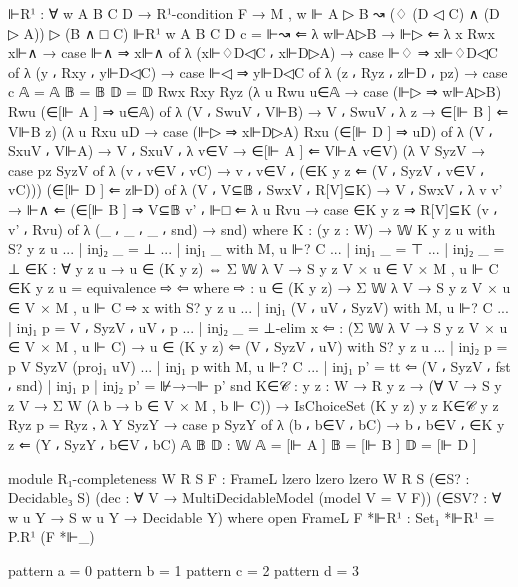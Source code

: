 \begin{spverbatim}
  ⊩R¹ : ∀ {w A B C D} → R¹-condition F
    → M , w ⊩ A ▷ B ↝ (♢ (D ◁ C) ∧ (D ▷ A)) ▷ (B ∧ □ C)
  ⊩R¹ {w} {A} {B} {C} {D} c = ⊩↝ ⇐ λ w⊩A▷B → ⊩▷ ⇐ λ { {x} Rwx x⊩∧ →
    case ⊩∧ ⇒ x⊩∧ of λ { (x⊩♢D◁C ⸴ x⊩D▷A) → case ⊩♢ ⇒ x⊩♢D◁C of
    λ { (y ⸴ Rxy ⸴ y⊩D◁C) → case ⊩◁ ⇒ y⊩D◁C of
    λ { (z ⸴ Ryz ⸴ z⊩D ⸴ pz) → case c {𝔸 = 𝔸} {𝔹 = 𝔹} {𝔻 = 𝔻} Rwx Rxy Ryz
    (λ {u} Rwu u∈𝔸 → case (⊩▷ ⇒ w⊩A▷B) Rwu (∈[⊩ A ] ⇒ u∈𝔸) of λ { (V ⸴ SwuV ⸴ V⊩B)
      → V ⸴ SwuV ⸴ λ {z → ∈[⊩ B ] ⇐ V⊩B z}}) (λ {u} Rxu uD → case (⊩▷ ⇒ x⊩D▷A) Rxu (∈[⊩ D ] ⇒ uD) of
      λ { (V ⸴ SxuV ⸴ V⊩A) → V ⸴ SxuV ⸴ λ {v∈V → ∈[⊩ A ] ⇐ V⊩A v∈V}}) (λ { {V} SyzV → case pz SyzV of
      λ { (v ⸴ v∈V ⸴ vC) → v ⸴ v∈V ⸴ (∈K y z ⇐ (V ⸴ SyzV ⸴ v∈V ⸴ vC))}}) (∈[⊩ D ] ⇐ z⊩D) of
    λ { (V ⸴ V⊆𝔹 ⸴ SwxV ⸴ R[V]⊆K) → V ⸴ SwxV ⸴ λ { {v} v' → ⊩∧ ⇐ (∈[⊩ B ] ⇒ V⊆𝔹 v' ⸴ ⊩□ ⇐
    λ { {u} Rvu → case ∈K y z ⇒ R[V]⊆K (v ⸴ v' ⸴ Rvu) of
    λ { (_ ⸴ _ ⸴ _ ⸴ snd) → snd}})}}}}}}
    where
    K : (y z : W) → 𝕎
    K y z u with S? y z u
    ... | inj₂ _ = ⊥
    ... | inj₁ _ with M, u ⊩? C
    ... | inj₁ _ = ⊤
    ... | inj₂ _ = ⊥
    ∈K : ∀ y z {u} → u ∈ (K y z) ⇔ Σ 𝕎 λ V → S y z V × u ∈ V × M , u ⊩ C
    ∈K y z {u} = equivalence ⇨ ⇦
      where
      ⇨ : u ∈ (K y z) → Σ 𝕎 λ V → S y z V × u ∈ V × M , u ⊩ C
      ⇨ x with S? y z u
      ... | inj₁ (V ⸴ uV ⸴ SyzV) with M, u ⊩? C
      ... | inj₁ p = V ⸴ SyzV ⸴ uV ⸴ p
      ... | inj₂ _ = ⊥-elim x
      ⇦ : (Σ 𝕎 λ V → S y z V × u ∈ V × M , u ⊩ C) → u ∈ (K y z)
      ⇦ (V ⸴ SyzV ⸴ uV) with S? y z u
      ... | inj₂ p = p V SyzV (proj₁ uV)
      ... | inj₁ p with M, u ⊩? C
      ... | inj₁ p' = tt
      ⇦ (V ⸴ SyzV ⸴ fst ⸴ snd) | inj₁ p | inj₂ p' = ⊮→¬⊩ p' snd
    K∈𝒞 : {y z : W} → R y z → (∀ {V} → S y z V → Σ W (λ b → b ∈ V × M , b ⊩ C)) → IsChoiceSet (K y z) y z
    K∈𝒞 {y} {z} Ryz p = Ryz ⸴ λ { {Y} SyzY → case p SyzY of λ { (b ⸴ b∈V ⸴ bC) → b ⸴ b∈V ⸴ ∈K y z ⇐ (Y ⸴ SyzY ⸴ b∈V ⸴ bC)}}
    𝔸 𝔹 𝔻 : 𝕎
    𝔸 = [⊩ A ]
    𝔹 = [⊩ B ]
    𝔻 = [⊩ D ]


module R₁-completeness
  {W R S}
  {F : FrameL {lzero} {lzero} {lzero} W R S}
  (∈S? : Decidable₃ S)
  (dec : ∀ V → MultiDecidableModel (model {V = V} F))
  (∈SV? : ∀ {w u Y} → S w u Y → Decidable Y)
  where
  open FrameL F
  *⊩R¹ : Set₁
  *⊩R¹ = P.R¹ (F *⊩_)

  pattern a = 0
  pattern b = 1
  pattern c = 2
  pattern d = 3



\end{spverbatim}
